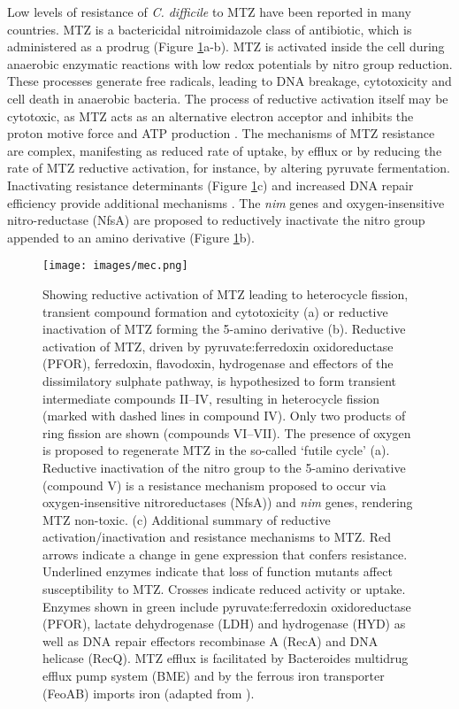 \documentclass{article}
\begin{document}
Low levels of resistance of {\it C. difficile} to MTZ have been reported in many countries. MTZ is a bactericidal nitroimidazole class of antibiotic, which is administered as a prodrug (Figure \ref{fig:mec}a-b). MTZ is activated inside the cell during anaerobic enzymatic reactions with low redox potentials by nitro group reduction. These processes generate free radicals, leading to DNA breakage, cytotoxicity and cell death in anaerobic bacteria. The process of reductive activation itself may be cytotoxic, as MTZ acts as an alternative electron acceptor and inhibits the proton motive force and ATP production \cite{Wickramage}. The mechanisms of MTZ resistance are complex, manifesting as reduced rate of uptake, by efflux or by reducing the rate of MTZ reductive activation, for instance, by altering pyruvate fermentation. Inactivating resistance determinants (Figure \ref{fig:mec}c) and increased DNA repair efficiency provide additional mechanisms \cite{Dingsdag}. The {\it nim} genes and oxygen-insensitive nitro-reductase (NfsA) are proposed to reductively inactivate the nitro group appended to an amino derivative (Figure \ref{fig:mec}b).

\begin{figure}
\centering
\texttt{[image: images/mec.png]}
\caption{\label{fig:mec} Showing reductive activation of MTZ leading to heterocycle fission, transient compound formation and cytotoxicity (a) or reductive inactivation of MTZ forming the 5-amino derivative (b). Reductive activation of MTZ, driven by pyruvate:ferredoxin oxidoreductase (PFOR), ferredoxin, flavodoxin, hydrogenase and effectors of the dissimilatory sulphate pathway, is hypothesized to form transient intermediate compounds II–IV, resulting in heterocycle fission (marked with dashed lines in compound IV). Only two products of ring fission are shown (compounds VI–VII). The presence of oxygen is proposed to regenerate MTZ in the so-called ‘futile cycle’ (a). Reductive inactivation of the nitro group to the 5-amino derivative (compound V) is a resistance mechanism proposed to occur via oxygen-insensitive nitroreductases (NfsA)) and {\it nim} genes, rendering MTZ non-toxic. (c) Additional summary of reductive activation/inactivation and resistance mechanisms to MTZ. Red arrows indicate a change in gene expression that confers resistance. Underlined enzymes indicate that loss of function mutants affect susceptibility to MTZ. Crosses indicate reduced activity or uptake. Enzymes shown in green include pyruvate:ferredoxin oxidoreductase (PFOR), lactate dehydrogenase (LDH) and hydrogenase (HYD) as well as DNA repair effectors recombinase A (RecA) and DNA helicase (RecQ). MTZ efflux is facilitated by Bacteroides multidrug efflux pump system (BME) and by the ferrous iron transporter (FeoAB) imports iron (adapted from \cite{Wickramage}).}
\end{figure}
\end{document}
